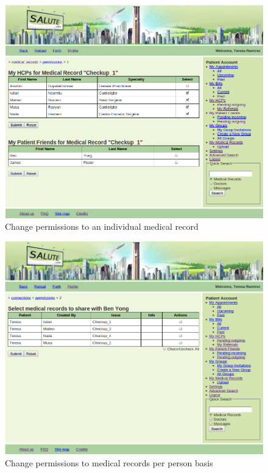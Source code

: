 \begin{figure}
\includegraphics[scale=0.5]{screenshots/change_permissions_to_medical_rec.png}
\caption{Change permissions to an individual medical record}
\end{figure}

\begin{figure}
\includegraphics[scale=0.5]{screenshots/change_permission_to_medical_records_per_person.png}
\caption{Change permissions to medical records per person basis}
\end{figure}

